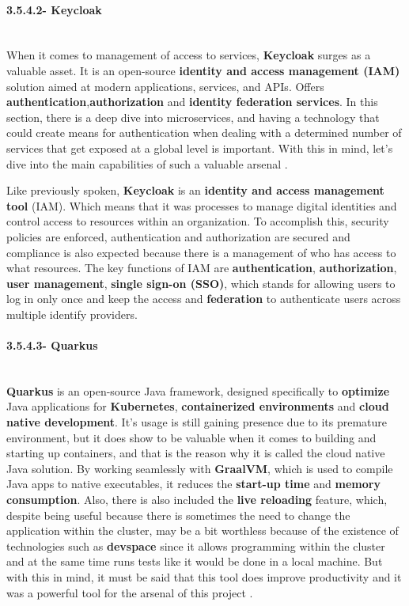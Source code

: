 \paragraph{3.5.4.2- Keycloak}\mbox{}\\
When it comes to management of access to services, \textbf{Keycloak} surges as a valuable asset. It is an open-source 
\textbf{identity and access management (IAM)} solution aimed at modern applications, services, and APIs. Offers 
\textbf{authentication},\textbf{authorization} and \textbf{identity federation services}. In this section, there is a deep dive 
into microservices, and having a technology that could create means for authentication when dealing with a determined number of services 
that get exposed at a global level is important. With this in mind, let's dive into the main capabilities of such a valuable
arsenal \cite{keycloak}.

Like previously spoken, \textbf{Keycloak} is an \textbf{identity and access management tool} (IAM). Which means that it was processes 
to manage digital identities and control access to resources within an organization. To accomplish this, security policies are enforced, 
authentication and authorization are secured and compliance is also expected because there is a management of who has access to 
what resources. The key functions of IAM are \textbf{authentication}, \textbf{authorization}, \textbf{user management}, 
\textbf{single sign-on (SSO)}, which stands for allowing users to log in only once and keep the access and \textbf{federation} to 
authenticate users across multiple identify providers.

\paragraph{3.5.4.3- Quarkus}\mbox{}\\
\textbf{Quarkus} is an open-source Java framework, designed specifically to \textbf{optimize} Java applications for \textbf{Kubernetes},
\textbf{containerized environments} and \textbf{cloud native development}. It's usage is still gaining presence due to its premature 
environment, but it does show to be valuable when it comes to building and starting up containers, and that is the reason why it is 
called the cloud native Java solution. By working seamlessly with \textbf{GraalVM}, which is used to compile Java apps to native executables,
it reduces the \textbf{start-up time} and \textbf{memory consumption}. Also, there is also included the \textbf{live reloading} feature, 
which, despite being useful because there is sometimes the need to change the application within the cluster, may be a bit worthless because 
of the existence of technologies such as \textbf{devspace} since it allows programming within the cluster and at the 
same time runs tests like it would be done in a local machine. But with this in mind, it must be said that this tool does improve 
productivity and it was a powerful tool for the arsenal of this project \cite{quarkus} \cite{quarkus2}.

